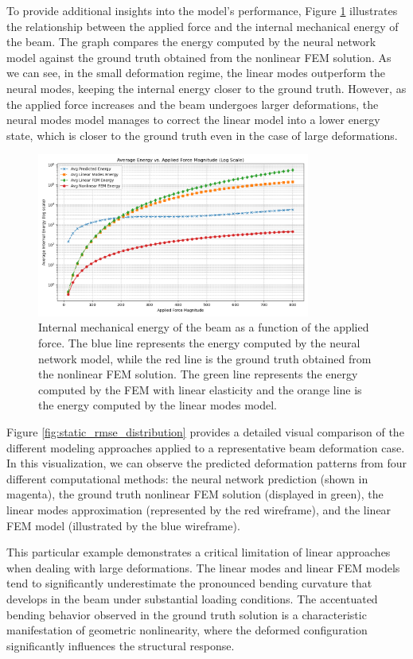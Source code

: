 To provide additional insights into the model's performance, Figure \ref{fig:static_energy_beam} illustrates the relationship between the applied force and the internal mechanical energy of the beam. The graph compares the energy computed by the neural network model against the ground truth obtained from the nonlinear FEM solution. As we can see, in the small deformation regime, the linear modes outperform the neural modes, keeping the internal energy closer  to the ground truth. However, as the applied force increases and the beam undergoes larger deformations, the neural modes model manages to correct the linear model into a lower energy state, which is closer to the ground truth even in the case of large deformations. 
\begin{figure}[H]
    \centering
    \includegraphics[width=0.8\textwidth]{Images/beam_static_energy.png}
    \caption{Internal mechanical energy of the beam as a function of the applied force. The blue line represents the energy computed by the neural network model, while the red line is the ground truth obtained from the nonlinear FEM solution. The green line represents the energy computed by the FEM with linear elasticity and the orange line is the energy computed by the linear modes model.}
    \label{fig:static_energy_beam}
\end{figure}


Figure \ref{fig:static_rmse_distribution} provides a detailed visual comparison of the different modeling approaches applied to a representative beam deformation case. In this visualization, we can observe the predicted deformation patterns from four different computational methods: the neural network prediction (shown in magenta), the ground truth nonlinear FEM solution (displayed in green), the linear modes approximation (represented by the red wireframe), and the linear FEM model (illustrated by the blue wireframe). 

This particular example demonstrates a critical limitation of linear approaches when dealing with large deformations. The linear modes and linear FEM models tend to significantly underestimate the pronounced bending curvature that develops in the beam under substantial loading conditions. The accentuated bending behavior observed in the ground truth solution is a characteristic manifestation of geometric nonlinearity, where the deformed configuration significantly influences the structural response.

